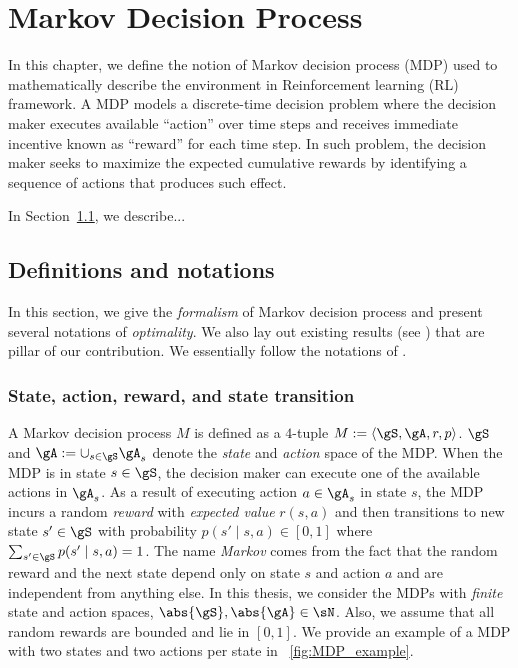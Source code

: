 
\chapter{Markov Decision Process}
\label{ch:mdp}


In this chapter, we define the notion of Markov decision process (MDP) used to mathematically describe the environment in Reinforcement learning (RL) framework.
A MDP models a discrete-time decision problem where the decision maker executes available ``action'' over time steps and receives immediate incentive known as ``reward'' for each time step.
In such problem, the decision maker seeks to maximize the expected cumulative rewards by identifying a sequence of actions that produces such effect.

In Section~\ref{ch:mdp:sec:defn}, we describe...


\section{Definitions and notations}
\label{ch:mdp:sec:defn}

In this section, we give the \emph{formalism} of Markov decision process and present several notations of \emph{optimality}.
We also lay out existing results (see \cite{puterman2014markov}) that are pillar of our contribution.
We essentially follow the notations of \cite{puterman2014markov}.

\subsection{State, action, reward, and state transition}

A Markov decision process $M$ is defined as a $4$-tuple $M:=\langle\gS, \gA, r, p\rangle$.
$\gS$ and $\gA:=\cup_{s\in\gS}\gA_s$ denote the \emph{state} and \emph{action} space of the MDP.
When the MDP is in state $s\in\gS$, the decision maker can execute one of the available actions in $\gA_s$.
As a result of executing action $a\in\gA_s$ in state $s$, the MDP incurs a random \emph{reward} with \emph{expected value} $r(s,a)$ and then transitions to new state $s'\in\gS$ with probability $p(s'\mid s, a)\in[0,1]$ where $\sum_{s'\in\gS}p(s'\mid s,a)=1$.
The name \emph{Markov} comes from the fact that the random reward and the next state depend only on state $s$ and action $a$ and are independent from anything else.
In this thesis, we consider the MDPs with \emph{finite} state and action spaces, $\abs{\gS}, \abs{\gA}\in\sN$.
Also, we assume that all random rewards are bounded and lie in $[0,1]$.
We provide an example of a MDP with two states and two actions per state in \figurename~\ref{fig:MDP_example}.

